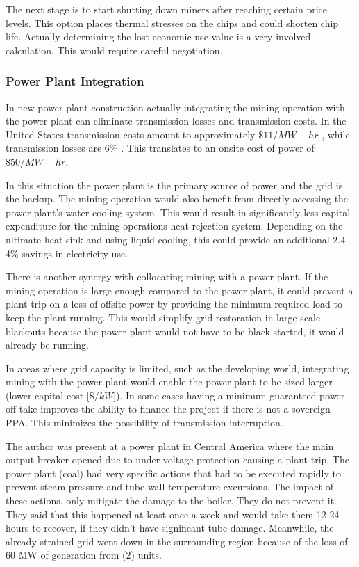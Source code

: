 \documentclass[runningheads]{llncs}
\begin{document}
The next stage is to start shutting down miners after reaching certain price levels.
This option places thermal stresses on the chips and could shorten chip life.
Actually determining the lost economic use value is a very involved calculation.
This would require careful negotiation.

\subsubsection{Power Plant Integration}
In new power plant construction actually integrating the mining operation with the power plant can eliminate transmission losses and transmission costs.
In the United States transmission costs amount to approximately $\$11/MW-hr$ \cite{ier2021transmission}, while transmission losses are 6\% \cite{worldbank2021losses}.
This translates to an onsite cost of power of $\$50/MW-hr$.

In this situation the power plant is the primary source of power and the grid is the backup.
The mining operation would also benefit from directly accessing the power plant's water cooling system.
This would result in significantly less capital expenditure for the mining operations heat rejection system.
Depending on the ultimate heat sink and using liquid cooling, this could provide an additional 2.4--4\% savings in electricity use.

There is another synergy with collocating mining with a power plant.
If the mining operation is large enough compared to the power plant, it could prevent a plant trip on a loss of offsite power by providing the minimum required load to keep the plant running.
This would simplify grid restoration in large scale blackouts because the power plant would not have to be black started, it would already be running.

In areas where grid capacity is limited, such as the developing world, integrating mining with the power plant would enable the power plant to be sized larger (lower capital cost [$\$/kW$]).
In some cases having a minimum guaranteed power off take improves the ability to finance the project if there is not a sovereign PPA.
This minimizes the possibility of transmission interruption.

The author was present at a power plant in Central America where the main output breaker opened due to under voltage protection causing a plant trip.
The power plant (coal) had very specific actions that had to be executed rapidly to prevent steam pressure and tube wall temperature excursions.
The impact of these actions, only mitigate the damage to the boiler.
They do not prevent it.
They said that this happened at least once a week and would take them 12-24 hours to recover, if they didn't have significant tube damage.
Meanwhile, the already strained grid went down in the surrounding region because of the loss of 60 MW of generation from (2) units.
\end{document}
